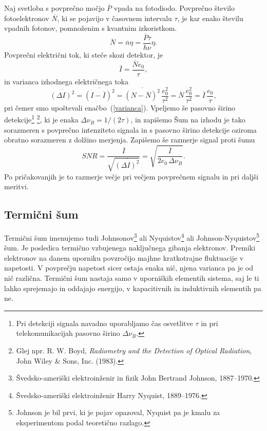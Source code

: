 Naj svetloba s povprečno močjo $\overline{P}$ vpada na fotodiodo.
Povprečno število fotoelektronov $\overline{N}$, ki se pojavijo v časovnem intervalu 
$\tau$, je kar enako številu vpadnih fotonov, pomnoženim 
s kvantnim izkoristkom. 
\begin{equation}
\overline{N} = \overline{n}\eta = \frac{\overline{P}\tau}{h \nu}\eta.
\end{equation}
Povprečni električni tok, ki steče skozi detektor, je  
\begin{equation}
\overline{I} = \frac{\overline{N} e_0}{\tau},
\end{equation}
in varianca izhodnega električnega toka 
\begin{equation}
\overline{(\Delta I)^2}=\overline{(I-\overline{I})^2} = \overline{(N-\overline{N})^2}\,
\frac{e_0^2}{\tau^2} = \overline{N}\,\frac{e_0^2}{\tau^2}= \overline{I}\,\frac{e_0}{\tau},
\end{equation}
pri čemer smo upoštevali enačbo~(\ref{varianca}). Vpeljemo še pasovno širino 
detekcije\footnote{Pri detekciji signala navadno uporabljamo
čas osvetlitve $\tau$ in pri telekomunikacijah pasovno širino $\Delta\nu_B$.}
\footnote{Glej npr. R. W. Boyd, 
{\it Radiometry and the Detection of Optical Radiation}, John Wiley \& Sons, Inc. (1983).}, ki je 
enaka $\Delta\nu_B = 1/(2\tau)$,
in zapišemo
Šum na izhodu je tako sorazmeren s povprečno intenziteto signala in 
s pasovno širino detekcije oziroma obratno sorazmeren z dolžino 
merjenja. Zapišemo še razmerje signal proti šumu 
\begin{equation}
SNR = \frac{\overline{I}}{\sqrt{\overline{(\Delta I)^2}}}= \sqrt{\frac{\overline{I}}
{2 e_0\, \Delta\nu_B}}.
\label{SNRs}
\end{equation}
Po pričakovanjih je to razmerje večje pri večjem povprečnem signalu in pri daljši meritvi.

\subsection*{Termični šum} 
Termični šum 
imenujemo tudi Johnsonov\footnote{Švedsko-ameriški elektroinženir in fizik 
John Bertrand Johnson, 1887--1970.} ali Nyquistov\footnote{Švedsko-ameriški elektroinženir
Harry Nyquist, 1889--1976.} ali Johnson-Nyquistov\footnote{Johnson je bil prvi, 
ki je pojav opazoval, 
Nyquist pa je kmalu za eksperimentom podal teoretično razlago.} šum. 
Je posledica termično vzbujenega naključnega gibanja elektronov. Premiki elektronov
na danem uporniku povzročijo majhne kratkotrajne 
fluktuacije v napetosti. V povprečju napetost sicer ostaja enaka nič, njena varianca pa je od 
nič različna. 
Termični šum nastaja samo v uporniških elementih sistema, saj le ti lahko
sprejemajo in oddajajo energijo, v kapacitivnih in induktivnih elementih pa ne.


